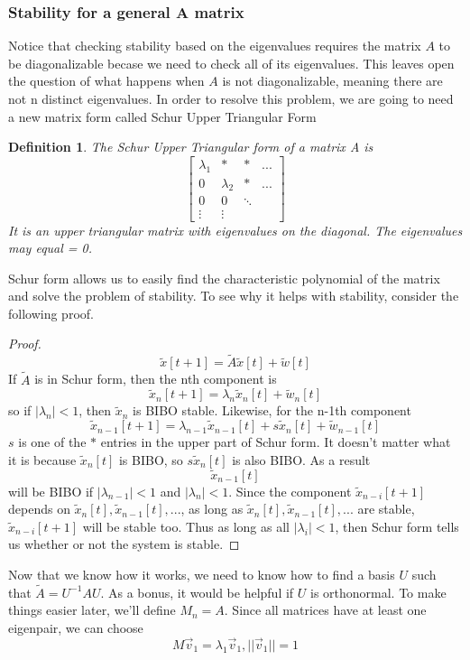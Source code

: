 \documentclass{article}
\newtheorem{definition}{Definition}
\newtheorem{proof}{Proof}
\begin{document}
\subsubsection{Stability for a general A matrix}
Notice that checking stability based on the eigenvalues requires the matrix $A$ to be diagonalizable becase we need to check all of its eigenvalues.
This leaves open the question of what happens when $A$ is not diagonalizable, meaning there are not n distinct eigenvalues.
In order to resolve this problem, we are going to need a new matrix form called Schur Upper Triangular Form
\begin{definition}
    The Schur Upper Triangular form of a matrix A is
    \[
        \left[
            \begin{array}{cccc}
                \lambda_1 & * & * & ... \\
                0 & \lambda_2 & * & ... \\
                0 & 0 & \ddots & \\
                \vdots & \vdots &  & 
            \end{array}
        \right]
        \]
    It is an upper triangular matrix with eigenvalues on the diagonal. The eigenvalues may equal = 0.
\end{definition}
Schur form allows us to easily find the characteristic polynomial of the matrix and solve the problem of stability.
To see why it helps with stability, consider the following proof.
\begin{proof}
    $$\tilde{x}[t+1]=\tilde{A}\tilde{x}[t]+\tilde{w}[t]$$
    If $\tilde{A}$ is in Schur form, then the nth component is
    $$\tilde{x}_n[t+1]=\lambda_n\tilde{x}_n[t]+\tilde{w}_n[t]$$
    so if $|\lambda_n| < 1$, then $\tilde{x}_n$ is BIBO stable.
    Likewise, for the n-1th component
    $$\tilde{x}_{n-1}[t+1]=\lambda_{n-1}\tilde{x}_{n-1}[t]+s\tilde{x}_n[t]+\tilde{w}_{n-1}[t]$$
    $s$ is one of the $*$ entries in the upper part of Schur form. It doesn't matter what it is because $\tilde{x}_n[t]$ is BIBO, so $s\tilde{x}_n[t]$ is also BIBO.
    As a result $$\tilde{x}_{n-1}[t]$$ will be BIBO if $|\lambda_{n-1}|<1$ and $|\lambda_n| < 1$.
    Since the component $\tilde{x}_{n-i}[t+1]$ depends on $\tilde{x}_n[t], \tilde{x}_{n-1}[t],...$, as long as $\tilde{x}_n[t], \tilde{x}_{n-1}[t],...$ are stable, $\tilde{x}_{n-i}[t+1]$ will be stable too.
    Thus as long as all $|\lambda_i|<1$, then Schur form tells us whether or not the system is stable.
\end{proof}
Now that we know how it works, we need to know how to find a basis $U$ such that $\tilde{A}=U^{-1}AU$. As a bonus, it would be helpful if $U$ is orthonormal.
To make things easier later, we'll define $M_n = A$. Since all matrices have at least one eigenpair, we can choose
$$M\vec{v}_1=\lambda_1\vec{v}_1, ||\vec{v}_1||=1$$
\end{document}
